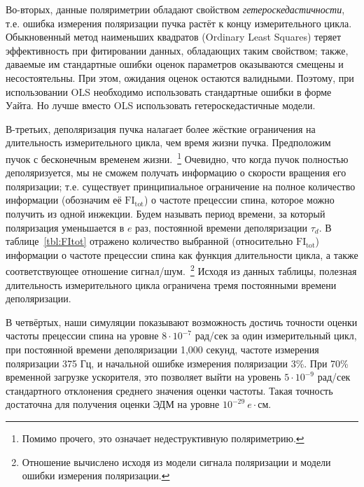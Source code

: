 Во-вторых, данные поляриметрии обладают свойством \emph{гетероскедастичности},  т.е. ошибка измерения поляризации пучка растёт к концу измерительного цикла.~\cite{Eversmann:Thesis} Обыкновенный метод наименьших квадратов (Ordinary Least Squares) теряет эффективность при фитировании данных, обладающих таким свойством; также, даваемые им стандартные ошибки оценок параметров оказываются смещены и несостоятельны. При этом, ожидания оценок остаются валидными. Поэтому, при использовании OLS необходимо использовать стандартные ошибки в форме Уайта. Но лучше вместо OLS использовать гетероскедастичные модели.~\cite{Stats:R:NLREG, Stats:HeteroskedasticNRM}

В-третьих, деполяризация пучка налагает более жёсткие ограничения на длительность измерительного цикла, чем время жизни пучка. Предположим пучок с бесконечным временем жизни.~\footnote{Помимо прочего, это означает недеструктивную поляриметрию.} Очевидно, что когда пучок полностью деполяризуется, мы не сможем получать информацию о скорости вращения его поляризации; т.е. существует принципиальное ограничение на полное количество информации (обозначим её $\mathrm{FI_{tot}}$) о частоте прецессии спина, которое можно получить из одной инжекции. Будем называть период времени, за который поляризация уменьшается в $e$ раз, постоянной времени деполяризации $\tau_d$. В таблице~\ref{tbl:FItot} отражено количество выбранной (относительно $\mathrm{FI_{tot}}$) информации о частоте прецессии спина как функция длительности цикла, а также соответствующее отношение сигнал/шум.~\footnote{Отношение вычислено исходя из модели сигнала поляризации и модели ошибки измерения поляризации.} Исходя из данных таблицы, полезная длительность измерительного цикла ограничена тремя постоянными времени деполяризации.

В четвёртых, наши симуляции показывают возможность достичь точности оценки частоты прецессии спина на уровне $8\cdot 10^{-7}$ рад/сек за один измерительный цикл, при постоянной времени деполяризации 1,000 секунд, частоте измерения поляризации 375 Гц, и начальной ошибке измерения поляризации 3\%. При 70\%  временной загрузке ускорителя, это позволяет выйти на уровень $5\cdot 10^{-9}$ рад/сек стандартного отклонения среднего значения оценки частоты. Такая точность достаточна для получения оценки ЭДМ на уровне $10^{-29}~e\cdot$см.

